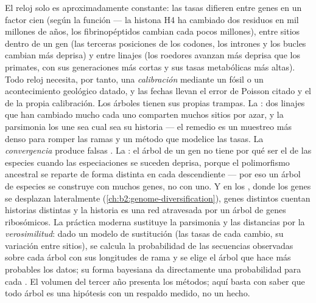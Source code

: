 \begin{proposition}\label{prop:b2:phylogenetic-trees:pitfalls}
El reloj solo es aproximadamente constante: las tasas difieren entre genes
en un factor cien (según la función --- la histona H4 ha cambiado dos
residuos en mil millones de años, los fibrinopéptidos cambian cada pocos
millones), entre sitios dentro de un gen (las terceras posiciones de los
codones, los intrones y los bucles cambian más deprisa) y entre linajes
(los roedores avanzan más deprisa que los primates, con sus generaciones
más cortas y sus tasas metabólicas más altas). Todo reloj necesita, por
tanto, una \emph{calibración} mediante un fósil o un acontecimiento
geológico datado, y las fechas llevan el error de Poisson citado y el de la
propia calibración. Los árboles tienen sus propias trampas. La
\emph{}: dos linajes que han cambiado mucho cada
uno comparten muchos sitios por azar, y la parsimonia los une sea cual sea
su historia --- el remedio es un muestreo más denso para romper las ramas y
un método que modelice las tasas. La \emph{convergencia} produce falsas
. La
\emph{}: el árbol de un gen no tiene por
qué ser el de las especies cuando las especiaciones se suceden deprisa,
porque el polimorfismo ancestral se reparte de forma distinta en cada
descendiente --- por eso un árbol de especies se construye con muchos genes,
no con uno. Y en los , donde los genes se desplazan
lateralmente (\cref{ch:b2:genome-diversification}), genes distintos
cuentan historias distintas y la historia es una red atravesada por un
árbol de genes ribosómicos. La práctica moderna sustituye la parsimonia y
las distancias por la \emph{verosimilitud}: dado un modelo de sustitución
(las tasas de cada cambio, su variación entre sitios), se calcula la
probabilidad de las secuencias observadas sobre cada árbol con sus
longitudes de rama y se elige el árbol que hace más probables los datos;
su forma bayesiana da directamente una probabilidad para cada . El
volumen del tercer año presenta los métodos; aquí basta con saber que
todo árbol es una hipótesis con un respaldo medido, no un hecho.
\end{proposition}
